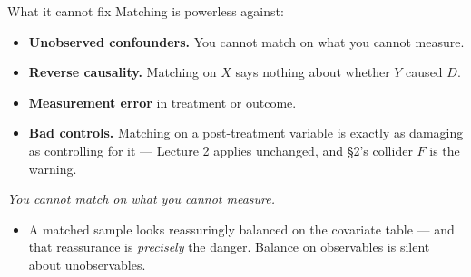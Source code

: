 \documentclass[
  11pt,
  ignorenonframetext,
  aspectratio=169,
]{beamer}
\providecommand{\tightlist}{%
  \setlength{\itemsep}{0pt}\setlength{\parskip}{0pt}}
\begin{document}
\begin{frame}{What it cannot fix}
\protect{}\label{what-it-cannot-fix}
Matching is powerless against:

\begin{itemize}
\tightlist
\item
  \textbf{Unobserved confounders.} You cannot match on what you cannot
  measure.
\item
  \textbf{Reverse causality.} Matching on \(X\) says nothing about
  whether \(Y\) caused \(D\).
\item
  \textbf{Measurement error} in treatment or outcome.
\item
  \textbf{Bad controls.} Matching on a post-treatment variable is
  exactly as damaging as controlling for it --- Lecture 2 applies
  unchanged, and §2's collider \(F\) is the warning.
\end{itemize}

\vspace{0.4em}

\begin{center}
\emph{You cannot match on what you cannot measure.}
\end{center}

\vspace{0.4em}

\begin{itemize}
\tightlist
\item
  A matched sample looks reassuringly balanced on the covariate table
  --- and that reassurance is \emph{precisely} the danger. Balance on
  observables is silent about unobservables.
\end{itemize}
\end{frame}
\end{document}
